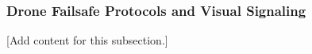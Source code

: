 
\subsubsection{Drone Failsafe Protocols and Visual Signaling}
\label{subsubsec:design_8_6_drone_failsafe_visual_signaling}

[Add content for this subsection.]
